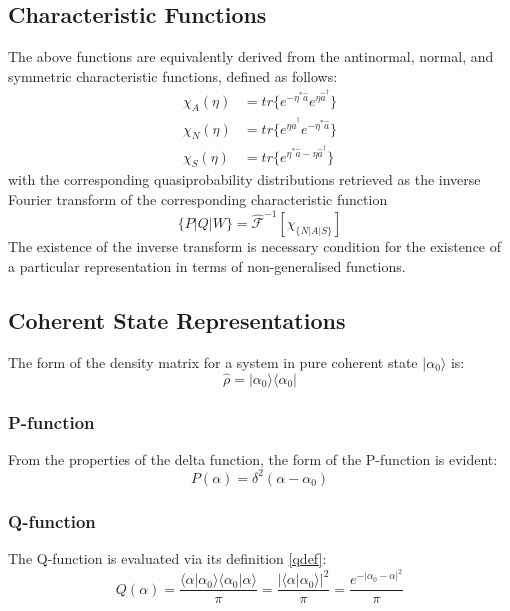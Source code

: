 \documentclass[reqno]{amsart}
\newcommand{\cre}{\hat{a}^\dagger}
\newcommand{\dens}{\hat{\rho}}
\begin{document}
\subsection{Characteristic Functions}

The above functions are equivalently derived from the antinormal, normal, and symmetric characteristic functions, defined as follows:
\begin{align}
	\chi_{A} (\eta) &= tr\{e^{-\eta^* \hat{a}}e^{\eta \cre } \} \\
	\chi_{N} (\eta) &= tr\{e^{\eta \cre}e^{-\eta^* \hat{a} } \} \\
	\chi_{S} (\eta) &= tr\{e^{\eta^* \hat{a}-\eta \cre } \} 
\end{align}
with the corresponding quasiprobability distributions retrieved as the inverse Fourier transform of the corresponding characteristic function
 \begin{equation}
 	\{P|Q|W\} = \hat{\mathscr{F}}^{-1} [\chi_{\{N|A|S\}}]
\end{equation}
The existence of the inverse transform is necessary condition for the existence of a particular representation in terms of non-generalised functions. 

\subsection{Coherent State Representations}

The form of the density matrix for a system in pure coherent state $ | \alpha_0 \rangle $  is:
\begin{equation}
 	\dens = | \alpha_0 \rangle \langle \alpha_0 | 
 \end{equation}
 \subsubsection{P-function}
 From the properties of the delta function, the form of the P-function is evident:
\begin{equation}
	P(\alpha) = \delta^2(\alpha-\alpha_0)
\end{equation}
\subsubsection{Q-function}
The Q-function is evaluated via its definition \ref{qdef}:
\begin{equation}
	Q(\alpha) = \frac{\langle \alpha | \alpha_0 \rangle \langle \alpha_0 | \alpha \rangle}{\pi} = \frac{{|\langle \alpha | \alpha_0 \rangle |}^2}{\pi} =  \frac{e^{-{|\alpha_0 - \alpha |}^2}}{\pi}
\end{equation}
\end{document}
